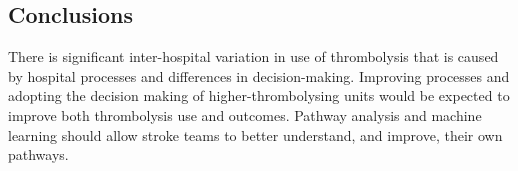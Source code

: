 \normalsize

\FloatBarrier

\subsection{Conclusions}

There is significant inter-hospital variation in use of thrombolysis that is caused by hospital processes and differences in decision-making. Improving processes and adopting the decision making of higher-thrombolysing units would be expected to improve both thrombolysis use and outcomes. Pathway analysis and machine learning should allow stroke teams to better understand, and improve, their own pathways.